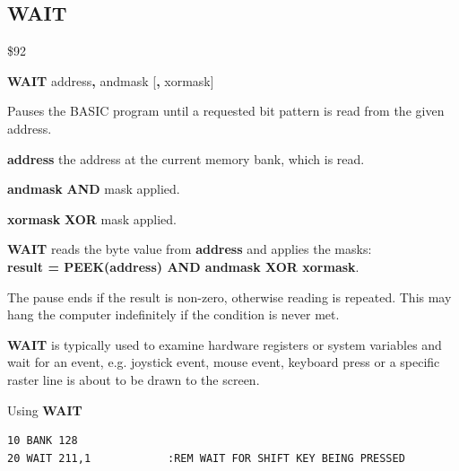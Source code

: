 
\newpage
\subsection{WAIT}
\begin{description}[leftmargin=2cm,style=nextline]
\item [Token:] \$92
\item [Format:] {\bf WAIT} address{\bf,} andmask [{\bf,} xormask]
\item [Usage:] Pauses the BASIC program until a requested
               bit pattern is read from the given address.

               {\bf address} the address at the current memory
               bank, which is read.

               {\bf andmask} {\bf AND} mask applied.

               {\bf xormask} {\bf XOR} mask applied.

               {\bf WAIT} reads the byte value from {\bf address}
               and applies the masks: \\
               {\bf result = PEEK(address) AND andmask XOR xormask}.

               The pause ends if the result is non-zero, otherwise
               reading is repeated. This may hang the computer
               indefinitely if the condition is never met.

\item [Remarks:] {\bf WAIT} is typically used to examine hardware
               registers or system variables
               and wait for an event, e.g. joystick event,
               mouse event, keyboard press or a specific raster line
               is about to be drawn to the screen.

\item [Example:] Using {\bf WAIT}
\begin{tcolorbox}[colback=black,coltext=white]
\verbatimfont{\codefont}
\begin{verbatim}
10 BANK 128
20 WAIT 211,1            :REM WAIT FOR SHIFT KEY BEING PRESSED
\end{verbatim}
\end{tcolorbox}
\end{description}


\newpage
